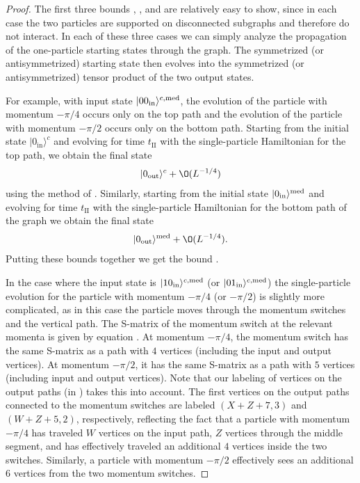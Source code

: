 \documentclass[../thesis-main/thesis-main]{subfiles}
\begin{document}
\begin{proof}
The first three bounds , , and  are relatively easy to show, since in each case the two particles are supported on disconnected subgraphs and therefore do not interact. In each of these three cases we can simply analyze the propagation of the one-particle starting states through the graph. The symmetrized (or antisymmetrized) starting state then evolves into the symmetrized (or antisymmetrized) tensor product of the two output states.

For example, with input state $|00_{\text{in}}\rangle^{c,\text{med}}$, the evolution of the particle with momentum $-{\pi}/{4}$ occurs only on the top path and the evolution of the particle with momentum $-{\pi}/{2}$ occurs only on the bottom path. Starting from the initial state $|0_\text{in}\rangle^c$ and evolving for time $t_{\mathrm{II}}$ with the single-particle Hamiltonian for the top path, we obtain the final state
\begin{align}
|0_\text{out}\rangle^c+\O(L^{-{1}/{4}})
\end{align}
using the method of . Similarly, starting from the initial state $|0_\text{in}\rangle^{\text{med}}$ and evolving for time $t_{\mathrm{II}}$ with the single-particle Hamiltonian
for the bottom path of the graph we obtain the final state
\begin{align}
|0_\text{out}\rangle^{\med}+\O(L^{-{1}/{4}}).
\end{align}
Putting these bounds together we get the bound .

In the case where the input state is $|10_{\text{in}}\rangle^{c,\text{med}}$ (or $|01_{\text{in}}\rangle^{c,\text{med}}$) the single-particle evolution for the particle with momentum $-{\pi}/{4}$ (or $-{\pi}/{2}$) is slightly more complicated, as in this case the particle moves through the momentum switches and the vertical path. The S-matrix of the momentum switch at the relevant momenta is given by equation . At momentum $-{\pi}/{4}$, the momentum switch has the same S-matrix as a path with $4$ vertices (including the input and output vertices). At momentum $-{\pi}/{2}$, it has the same S-matrix as a path with $5$ vertices (including input and output vertices). Note that our labeling of vertices on the output paths (in ) takes this into account. The first vertices on the output paths connected to the momentum switches are labeled $(X+Z+7,3)$ and $(W+Z+5,2)$, respectively, reflecting the fact that a particle with momentum $-{\pi}/{4}$ has traveled $W$ vertices on the input path, $Z$ vertices through the middle segment, and has effectively traveled an additional $4$ vertices inside the two switches. Similarly, a particle with momentum $-{\pi}/{2}$ effectively sees an additional $6$ vertices from the two momentum switches.


\end{proof}
\end{document}
